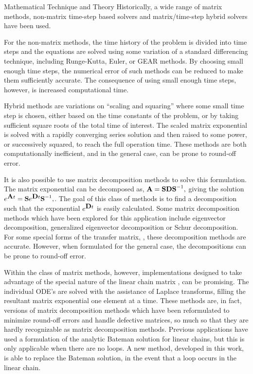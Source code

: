 \begin{chapter}{Mathematical Technique and Theory\label{chap:math}}
  Historically, a wide range of matrix methods, non-matrix time-step
  based solvers and matrix/time-step hybrid solvers have been used.
  
  For the non-matrix methods, the time history of the problem is
  divided into time steps and the equations are solved using some
  variation of a standard differencing technique, including
  Runge-Kutta, Euler, or GEAR methods.  By choosing small enough time
  steps, the numerical error of such methods can be reduced to make
  them sufficiently accurate.  The consequence of using small enough
  time steps, however, is increased computational time.
  
  Hybrid methods are variations on ``scaling and squaring'' where some
  small time step is chosen, either based on the time constants of the
  problem, or by taking sufficient square roots of the total time of
  interest.  The scaled matrix exponential is solved with a rapidly
  converging series solution and then raised to some power, or
  successively squared, to reach the full operation time.  These
  methods are both computationally inefficient, and in the general
  case, can be prone to round-off error.
  
  It is also possible to use matrix decomposition methods to solve
  this formulation.  The matrix exponential can be decomposed as,
  $\mbox{$\mathbf{A}$} = \mbox{$\mathbf{S}$}\mbox{$\mathbf{D}$}\mbox{$\mathbf{S}$}^{-1},$ giving the solution
  $e^{\mbox{$\mathbf{A}$} t} = \mbox{$\mathbf{S}$}e^{\mbox{$\mathbf{D}$} t}\mbox{$\mathbf{S}$}^{-1},$.  The goal of
  this class of methods is to find a decomposition such that the
  exponential $e^{\mbox{$\mathbf{D}$} t}$ is easily calculated. Some matrix
  decomposition methods which have been explored for this application
  include eigenvector decomposition\cite{eigenvectors}, generalized
  eigenvector decomposition\cite{GERAPH} or Schur
  decomposition\cite{RACCP}.  For some special forms of the transfer
  matrix, , these decomposition methods are accurate.  However,
  when formulated for the general case, the decompositions can be
  prone to round-off error.
  
  Within the class of matrix methods, however, implementations
  designed to take advantage of the special nature of the linear chain
  matrix , can be promising.  The individual ODE's are solved
  with the assistance of Laplace transforms, filling the resultant
  matrix exponential one element at a time.  These methods are, in
  fact, versions of matrix decomposition methods which have been
  reformulated to minimize round-off errors and handle defective
  matrices, so much so that they are hardly recognizable as matrix
  decomposition methods.  Previous applications have used a
  formulation of the analytic Bateman\cite{DKR,DKRICF,DKRP} solution
  for linear chains, but this is only applicable when there are no
  loops.  A new method, developed in this work, is able to replace the
  Bateman solution, in the event that a loop occurs in the linear
  chain.
  

\end{chapter}
